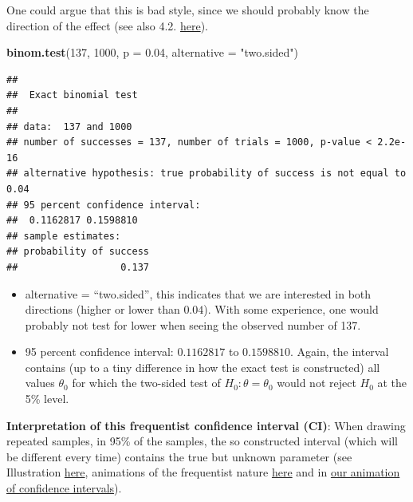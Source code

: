 \documentclass[
]{book}
\newenvironment{Shaded}{\begin{snugshade}}{\end{snugshade}}
\newcommand{\AttributeTok}[1]{\textcolor[rgb]{0.13,0.29,0.53}{#1}}
\newcommand{\DecValTok}[1]{\textcolor[rgb]{0.00,0.00,0.81}{#1}}
\newcommand{\FloatTok}[1]{\textcolor[rgb]{0.00,0.00,0.81}{#1}}
\newcommand{\FunctionTok}[1]{\textcolor[rgb]{0.13,0.29,0.53}{\textbf{#1}}}
\newcommand{\NormalTok}[1]{#1}
\newcommand{\StringTok}[1]{\textcolor[rgb]{0.31,0.60,0.02}{#1}}
\providecommand{\tightlist}{%
  \setlength{\itemsep}{0pt}\setlength{\parskip}{0pt}}
\begin{document}
One could argue that this is bad style, since we should probably know the direction of the effect
(see also 4.2. \href{https://errorstatistics.com/wp-content/uploads/2015/07/cox-1977-with-discussion-and-reply-nc.pdf}{here}).

\begin{Shaded}
\begin{Highlighting}[]
\FunctionTok{binom.test}\NormalTok{(}\DecValTok{137}\NormalTok{, }\DecValTok{1000}\NormalTok{, }\AttributeTok{p =} \FloatTok{0.04}\NormalTok{, }\AttributeTok{alternative =} \StringTok{"two.sided"}\NormalTok{)}
\end{Highlighting}
\end{Shaded}

\begin{verbatim}
## 
##  Exact binomial test
## 
## data:  137 and 1000
## number of successes = 137, number of trials = 1000, p-value < 2.2e-16
## alternative hypothesis: true probability of success is not equal to 0.04
## 95 percent confidence interval:
##  0.1162817 0.1598810
## sample estimates:
## probability of success 
##                  0.137
\end{verbatim}

\begin{itemize}
\tightlist
\item
  alternative = ``two.sided'', this indicates that we are interested in both directions (higher or lower than \(0.04\)).
  With some experience, one would probably not test for lower when seeing the observed number of 137.
\item
  95 percent confidence interval: \(0.1162817\) to \(0.1598810\).
  Again, the interval contains (up to a tiny difference in how the exact test is constructed)
  all values \(\theta_0\) for which the two-sided test of \(H_0: \theta = \theta_0\) would not reject \(H_0\) at the 5\% level.
\end{itemize}

\textbf{Interpretation of this frequentist confidence interval (CI)}: When drawing repeated samples, in 95\% of the samples,
the so constructed interval (which will be different every time) contains the true but unknown
parameter (see Illustration \href{https://en.wikipedia.org/wiki/Confidence_interval\#/media/File:Normal_distribution_50\%25_CI_illustration.svg}{here},
animations of the frequentist nature \href{https://seeing-theory.brown.edu/frequentist-inference/index.html}{here} and in
\href{https://jdegenfellner.github.io/Script_QM1_ZHAW/animations/16_Konfidenzintervalle_frequentistisch.html}{our animation of confidence intervals}).
\end{document}
